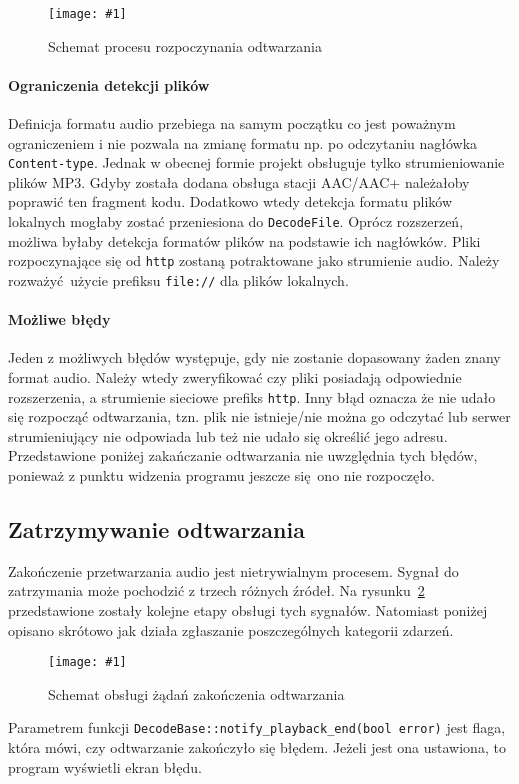 \documentclass[polish]{aghengthesis}
\newcommand{\imgint}[4]{
	\begin{figure}[{#4}]
		\centering
		\texttt{[image: \#1]}
		\caption{#2}
		\label{#1}
	\end{figure}
}
\newcommand{\imgh}[3]{\imgint{#1}{#2}{#3}{H}}
\begin{document}
			\imgh{3/PicoRadio-start}{Schemat procesu rozpoczynania odtwarzania}{0.7}
				
			\paragraph{Ograniczenia detekcji plików}
				Definicja formatu audio przebiega na samym początku co jest poważnym ograniczeniem i nie pozwala na zmianę formatu np. po odczytaniu nagłówka \lstinline|Content-type|. Jednak w obecnej formie projekt obsługuje tylko strumieniowanie plików MP3. Gdyby została dodana obsługa stacji AAC/AAC+ należałoby poprawić ten fragment kodu. Dodatkowo wtedy detekcja formatu plików lokalnych mogłaby zostać przeniesiona do \lstinline|DecodeFile|. Oprócz rozszerzeń, możliwa byłaby detekcja formatów plików na podstawie ich nagłówków. Pliki rozpoczynające się od \lstinline|http| zostaną potraktowane jako strumienie audio. Należy rozważyć użycie prefiksu \lstinline|file://| dla plików lokalnych.
			
			\paragraph{Możliwe błędy}
				Jeden z możliwych błędów występuje, gdy nie zostanie dopasowany żaden znany format audio. Należy wtedy zweryfikować czy pliki posiadają odpowiednie rozszerzenia, a strumienie sieciowe prefiks \lstinline|http|. Inny błąd oznacza że nie udało się rozpocząć odtwarzania, tzn. plik nie istnieje/nie można go odczytać lub serwer strumieniujący nie odpowiada lub też nie udało się określić jego adresu. Przedstawione poniżej zakańczanie odtwarzania nie uwzględnia tych błędów, ponieważ z punktu widzenia programu jeszcze się ono nie rozpoczęło.
		
		\subsection{Zatrzymywanie odtwarzania}
			Zakończenie przetwarzania audio jest nietrywialnym procesem. Sygnał do zatrzymania może pochodzić z trzech różnych źródeł. Na rysunku~\ref{3/PicoRadio-stop} przedstawione zostały kolejne etapy obsługi tych sygnałów. Natomiast poniżej opisano skrótowo jak działa zgłaszanie poszczególnych kategorii zdarzeń. 
			
			\imgh{3/PicoRadio-stop}{Schemat obsługi żądań zakończenia odtwarzania}{1}
			
			Parametrem funkcji \lstinline|DecodeBase::notify_playback_end(bool error)| jest flaga, która mówi, czy odtwarzanie zakończyło się błędem. Jeżeli jest ona ustawiona, to program wyświetli ekran błędu.
			
\end{document}
